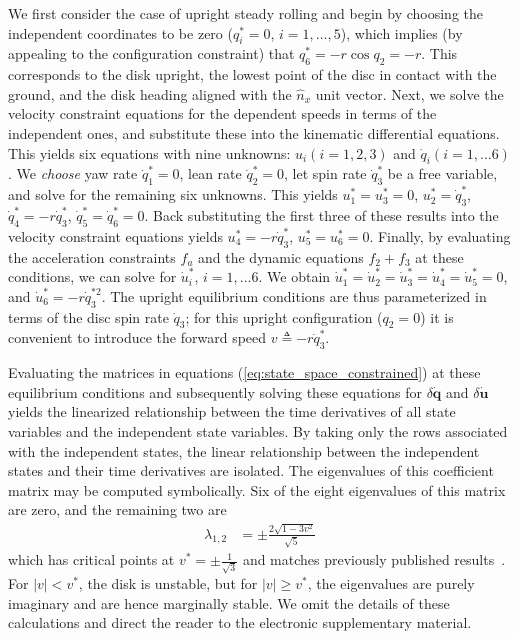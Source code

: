 \documentclass[smallcondensed,final]{svjour3}                     %
\begin{document}
We first consider the case of upright steady rolling and begin by choosing the
independent coordinates to be zero ($q_i^* = 0$, $i = 1,\dots,5$), which
implies (by appealing to the configuration constraint) that $q_6^* = -r
\cos{q_2} = -r$.  This corresponds to the disk upright, the lowest point of the
disc in contact with the ground, and the disk heading aligned with the
$\hat{n}_x$ unit vector.  Next, we solve the velocity constraint equations for
the dependent speeds in terms of the independent ones, and substitute these
into the kinematic differential equations. This yields six equations with nine
unknowns: $u_i (i=1,2,3)$ and $\dot{q}_i (i=1,\dots6)$. We \textit{choose} yaw
rate $\dot{q}_1^* = 0$, lean rate $\dot{q}_2^* = 0$, let spin rate
$\dot{q}_3^*$ be a free variable, and solve for the remaining six unknowns.
This yields $u_1^* = u_3^* = 0$, $u_2^* = \dot{q}_3^*$, $\dot{q}_4^* =
-r\dot{q}_3^*$, $\dot{q}_5^* = \dot{q}_6^* = 0$. Back substituting the first
three of these results into the velocity constraint equations yields $u_4^* =
-r\dot{q}_3^*$, $u_5^* = u_6^* = 0$. Finally, by evaluating the acceleration
constraints $f_a$ and the dynamic equations $f_2 + f_3$ at these conditions, we
can solve for $\dot{u}_i^*$, $i = 1,\dots6$. We obtain $\dot{u}_1^* =
\dot{u}_2^* = \dot{u}_3^* = \dot{u}_4^* = \dot{u}_5^* = 0$, and $\dot{u}_6^* =
-r \dot{q}_3^{*2}$. The upright equilibrium conditions are thus parameterized
in terms of the disc spin rate $\dot{q}_3$; for this upright configuration
($q_2 = 0$) it is convenient to introduce the forward speed $v \triangleq
-r\dot{q}_3^*$.

Evaluating the matrices in equations (\ref{eq:state_space_constrained}) at
these equilibrium conditions and subsequently solving these equations for
$\delta\dot{\mathbf{q}}$ and $\delta\dot{\mathbf{u}}$ yields the linearized
relationship between the time derivatives of all state variables and the
independent state variables. By taking only the rows associated with the
independent states, the linear relationship between the independent states and
their time derivatives are isolated. The eigenvalues of this coefficient matrix
may be computed symbolically. Six of the eight eigenvalues of this matrix are
zero, and the remaining two are
\begin{align}
\label{eq:upright_evals}
  \lambda_{1,2} &= \pm \frac{2\sqrt{1 - 3v^2}}{\sqrt{5}}
\end{align}
which has critical points at $v^*=\pm\frac{1}{\sqrt{3}}$ and matches previously
published results~\cite{Schwab2003,Kane1985,Neimark1972}. For $|v| < v^*$,
the disk is unstable, but for $|v| \geq v^*$, the eigenvalues are purely
imaginary and are hence marginally stable. We omit the details of these
calculations and direct the reader to the electronic supplementary material.
\end{document}
